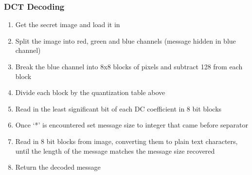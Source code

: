 \documentclass[11pt,letterpaper]{article}
\begin{document}
\subsubsection{DCT Decoding}
\begin{enumerate}
\setlength\itemsep{0pt}
\item Get the secret image and load it in
\item Split the image into red, green and blue channels (message hidden in blue channel)
\item Break the blue channel into 8x8 blocks of pixels and subtract 128 from each block
\item Divide each block by the quantization table above
\item Read in the least significant bit of each DC coefficient in 8 bit blocks
\item Once ‘*’ is encountered set message size to integer that came before separator
\item Read in 8 bit blocks from image, converting them to plain text characters, until the length of the message matches the message size recovered
\item Return the decoded message
\end{enumerate}
\end{document}
